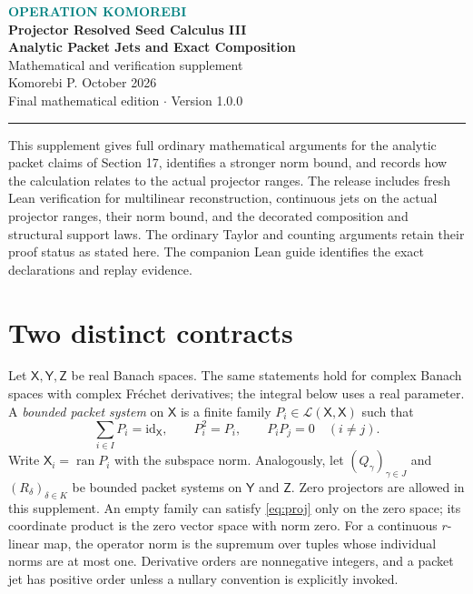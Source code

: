 \documentclass[11pt]{article}
\theoremstyle{remark}\newtheorem{remark}[theorem]{Remark}
\newcommand{\X}{\mathsf X}\newcommand{\Y}{\mathsf Y}\newcommand{\Z}{\mathsf Z}
\newcommand{\id}{\mathrm{id}}
\newcommand{\op}{\operatorname}
\begin{document}
\begin{center}
{\small\bfseries\textcolor{teal}{OPERATION KOMOREBI}}\\[5pt]
{\Large\bfseries Projector Resolved Seed Calculus III}\\[7pt]
{\LARGE\bfseries Analytic Packet Jets and Exact Composition}\\[8pt]
{\large Mathematical and verification supplement}\\[8pt]
{\normalsize Komorebi P.  October 2026}\\[9pt]
{\small Final mathematical edition \quad $\cdot$ \quad Version 1.0.0}
\end{center}
\vspace{6pt}
\noindent\rule{\linewidth}{.8pt}
\vspace{4pt}
This supplement gives full ordinary mathematical arguments for the analytic packet claims of Section 17, identifies a stronger norm bound, and records how the calculation relates to the actual projector ranges. The release includes fresh Lean verification for multilinear reconstruction, continuous jets on the actual projector ranges, their norm bound, and the decorated composition and structural support laws. The ordinary Taylor and counting arguments retain their proof status as stated here. The companion Lean guide identifies the exact declarations and replay evidence.

\section{Two distinct contracts}
Let $\X,\Y,\Z$ be real Banach spaces. The same statements hold for complex Banach spaces with complex Fr\'echet derivatives; the integral below uses a real parameter. A \emph{bounded packet system} on $\X$ is a finite family $P_i\in\mathcal L(\X,\X)$ such that
\begin{equation}\label{eq:proj}
\sum_{i\in I}P_i=\id_{\X},\qquad P_i^2=P_i,\qquad P_iP_j=0\quad(i\ne j).
\end{equation}
Write $\X_i=\op{ran}P_i$ with the subspace norm. Analogously, let $(Q_\gamma)_{\gamma\in J}$ and $(R_\delta)_{\delta\in K}$ be bounded packet systems on $\Y$ and $\Z$. Zero projectors are allowed in this supplement. An empty family can satisfy \eqref{eq:proj} only on the zero space; its coordinate product is the zero vector space with norm zero. For a continuous $r$-linear map, the operator norm is the supremum over tuples whose individual norms are at most one. Derivative orders are nonnegative integers, and a packet jet has positive order unless a nullary convention is explicitly invoked.
\end{document}
